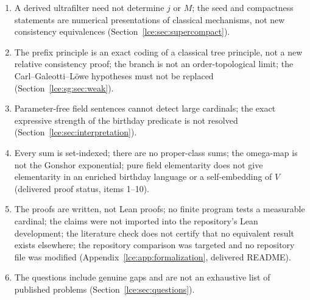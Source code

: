 \documentclass[11pt,letterpaper]{article}
\numberwithin{equation}{section}
\theoremstyle{definition}
\theoremstyle{remark}
\begin{document}
\begin{enumerate}[label=09.\arabic*]
yields a measure; a zero coefficient is not a zero defect; masks are not
ordinary idempotents; the numerical criterion is infinitary and not
first-order in the bare field or omnific-ring language
(Section~\ref{lce:sec:measure}).
\item A derived ultrafilter need not determine $j$ or $M$; the seed and
compactness statements are numerical presentations of classical mechanisms,
not new consistency equivalences (Section~\ref{lce:sec:supercompact}).
\item The prefix principle is an exact coding of a classical tree principle,
not a new relative consistency proof; the branch is not an
order-topological limit; the Carl--Galeotti--L\"owe hypotheses must not be
replaced (Section~\ref{lce:sg:sec:weak}).
\item Parameter-free field sentences cannot detect large cardinals; the
exact expressive strength of the birthday predicate is not resolved
(Section~\ref{lce:sec:interpretation}).
\item Every sum is set-indexed; there are no proper-class sums; the
omega-map is not the Gonshor exponential; pure field elementarity does not
give elementarity in an enriched birthday language or a self-embedding of
$V$ (delivered proof status, items 1--10).
\item The proofs are written, not Lean proofs; no finite program tests a
measurable cardinal; the claims were not imported into the repository's
Lean development; the literature check does not certify that no equivalent
result exists elsewhere; the repository comparison was targeted and no
repository file was modified (Appendix~\ref{lce:app:formalization},
delivered README).
\item The questions include genuine gaps and are not an exhaustive list of
published problems (Section~\ref{lce:sec:questions}).
\end{enumerate}
\end{document}
